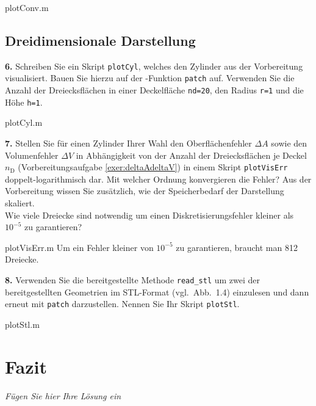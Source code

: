 \documentclass[Protokollheft.tex]{subfiles}
\begin{document}
 {plotConv.m}



{\subsection{Dreidimensionale Darstellung}}

        \begin{framed}
	\noindent \textbf{6.} Schreiben Sie ein Skript \lstinline{plotCyl}, welches den Zylinder aus der Vorbereitung visualisiert.
Bauen Sie hierzu auf der \matlab-Funktion \lstinline{patch} auf. Verwenden Sie die Anzahl der Dreiecksflächen
                    in einer Deckelfläche \lstinline{nd=20}, den Radius \lstinline{r=1} und die Höhe \lstinline {h=1}.\label{exer:plotCyl}
\end{framed}

 {plotCyl.m}

        \begin{framed}
	\noindent \textbf{7.} Stellen Sie für einen Zylinder Ihrer Wahl den Oberflächenfehler $\Delta A$ sowie den Volumenfehler $\Delta V$ in Abhängigkeit von der Anzahl der Dreiecksflächen je Deckel $n_\text{D}$ (Vorbereitungsaufgabe \ref{exer:deltaAdeltaV}) in einem Skript
                    \lstinline{plotVisErr} doppelt-logarithmisch dar.   Mit welcher Ordnung konvergieren die Fehler?
                    Aus der Vorbereitung wissen Sie zusätzlich, wie der Speicherbedarf der
                    Darstellung skaliert.\\
                    Wie viele Dreiecke sind notwendig um einen Diskretisierungsfehler kleiner als $10^{-5}$ zu garantieren?\label{exer:plotVisErr}
\end{framed}

 {plotVisErr.m}
Um ein Fehler kleiner von $10^{-5}$ zu garantieren, braucht man 812 Dreiecke.

      \begin{framed}
	\noindent \textbf{8.} Verwenden Sie die bereitgestellte Methode \lstinline{read_stl} um zwei der bereitgestellten Geometrien im STL-Format (vgl.~Abb.~1.4) einzulesen und dann erneut mit \lstinline{patch} darzustellen.
                Nennen Sie Ihr Skript \lstinline{plotStl}.\label{exer:plotStl}
\end{framed}

 {plotStl.m}


\section{Fazit}
\emph{Fügen Sie hier Ihre Lösung ein}
\end{document}
